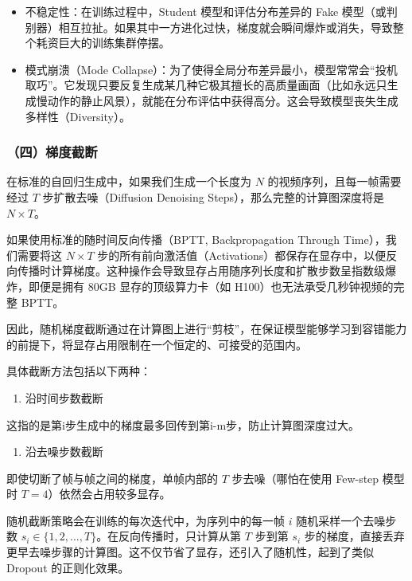 \begin{itemize}
\tightlist
\item
  不稳定性：在训练过程中，Student 模型和评估分布差异的 Fake 模型（或判别器）相互拉扯。如果其中一方进化过快，梯度就会瞬间爆炸或消失，导致整个耗资巨大的训练集群停摆。
\item
  模式崩溃（Mode Collapse）：为了使得全局分布差异最小，模型常常会``投机取巧''。它发现只要反复生成某几种它极其擅长的高质量画面（比如永远只生成慢动作的静止风景），就能在分布评估中获得高分。这会导致模型丧失生成多样性（Diversity）。
\end{itemize}

\hypertarget{ux56dbux68afux5ea6ux622aux65ad}{%
\subsubsection{（四）梯度截断}\label{ux56dbux68afux5ea6ux622aux65ad}}

在标准的自回归生成中，如果我们生成一个长度为 \(N\) 的视频序列，且每一帧需要经过 \(T\) 步扩散去噪（Diffusion Denoising Steps），那么完整的计算图深度将是 \(N\times T\)。

如果使用标准的随时间反向传播（BPTT, Backpropagation Through Time），我们需要将这 \(N\times T\) 步的所有前向激活值（Activations）都保存在显存中，以便反向传播时计算梯度。这种操作会导致显存占用随序列长度和扩散步数呈指数级爆炸，即便是拥有 80GB 显存的顶级算力卡（如 H100）也无法承受几秒钟视频的完整 BPTT。

因此，随机梯度截断通过在计算图上进行``剪枝''，在保证模型能够学习到容错能力的前提下，将显存占用限制在一个恒定的、可接受的范围内。

具体截断方法包括以下两种：

\begin{enumerate}
\def\labelenumi{\arabic{enumi}.}
\tightlist
\item
  沿时间步数截断
\end{enumerate}

这指的是第i步生成中的梯度最多回传到第i-m步，防止计算图深度过大。

\begin{enumerate}
\def\labelenumi{\arabic{enumi}.}
\setcounter{enumi}{1}
\tightlist
\item
  沿去噪步数截断
\end{enumerate}

即使切断了帧与帧之间的梯度，单帧内部的 \(T\) 步去噪（哪怕在使用 Few-step 模型时 \(T=4\)）依然会占用较多显存。

随机截断策略会在训练的每次迭代中，为序列中的每一帧 \(i\) 随机采样一个去噪步数 \(s_i\in\{1,2,\ldots,T\}\)。在反向传播时，只计算从第 \(T\) 步到第 \(s_i\) 步的梯度，直接丢弃更早去噪步骤的计算图。这不仅节省了显存，还引入了随机性，起到了类似 Dropout 的正则化效果。


